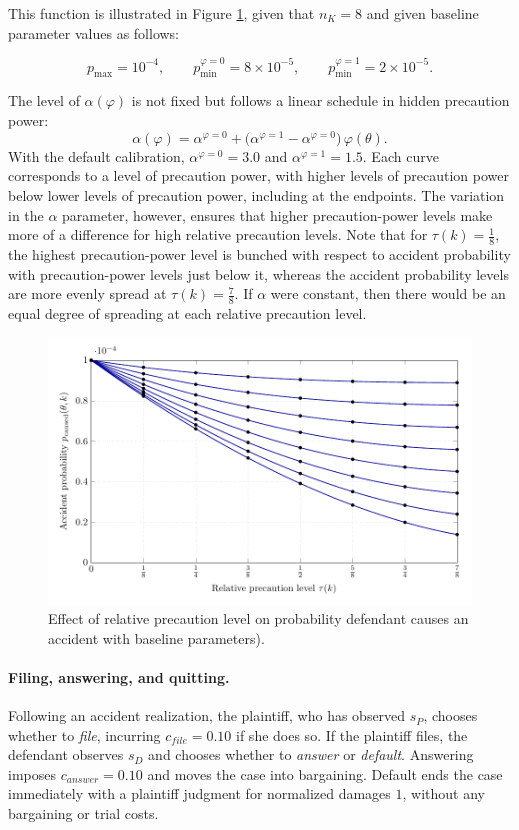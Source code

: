 \documentclass{article}
\begin{document}
This function is illustrated in Figure \ref{fig:precaution.pdf}, given that $n_K = 8$ and given baseline parameter values as follows:

\[
p_{\max}=10^{-4}, \qquad 
p_{\min}^{\varphi=0}=8\times 10^{-5}, \qquad 
p_{\min}^{\varphi=1}=2\times 10^{-5}.
\]

The level of $\alpha(\varphi)$ is not fixed but follows a linear schedule in hidden precaution power:
\[
\alpha(\varphi) = \alpha^{\varphi=0} + 
\bigl(\alpha^{\varphi=1}-\alpha^{\varphi=0}\bigr)\,\varphi(\theta).
\]
With the default calibration, $\alpha^{\varphi=0}=3.0$ and $\alpha^{\varphi=1}=1.5$. Each curve corresponds to a level of precaution power, with higher levels of precaution power below lower levels of precaution power, including at the endpoints. The variation in the $\alpha$ parameter, however, ensures that higher precaution-power levels make more of a difference for high relative precaution levels. Note that for $\tau(k) = \frac{1}{8}$, the highest precaution-power level is bunched with respect to accident probability with precaution-power levels just below it, whereas the accident probability levels are more evenly spread at $\tau(k) = \frac{7}{8}$. If $\alpha$ were constant, then there would be an equal degree of spreading at each relative precaution level.

  \begin{figure}[t]
    \centering
    \includegraphics[width=\textwidth]{../Figures/precaution.pdf}
    \caption{Effect of relative precaution level on probability defendant causes an accident with baseline parameters).}
    \label{fig:precaution.pdf}
  \end{figure}

\paragraph{Filing, answering, and quitting.}
Following an accident realization, the plaintiff, who has observed $s_P$, chooses whether to \emph{file}, incurring $c_{file}=0.10$ if she does so. If the plaintiff files, the defendant observes $s_D$ and chooses whether to \emph{answer} or \emph{default}. Answering imposes $c_{answer}=0.10$ and moves the case into bargaining. Default ends the case immediately with a plaintiff judgment for normalized damages $1$, without any bargaining or trial costs.
\end{document}
